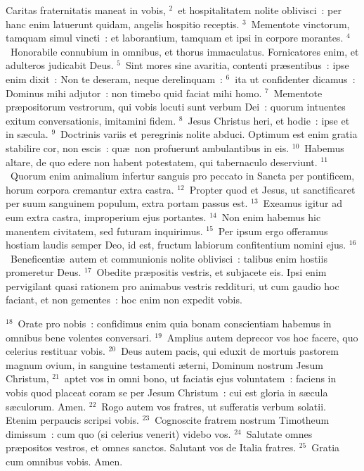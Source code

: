 \lettrine[lines=3,image=true,loversize=0.05,lraise=-0.03]{C}{}aritas fraternitatis maneat in vobis,
${}^{2}$~et hospitalitatem nolite oblivisci~: per hanc enim latuerunt quidam, angelis hospitio receptis.
${}^{3}$~Mementote vinctorum, tamquam simul vincti~: et laborantium, tamquam et ipsi in corpore morantes.
${}^{4}$~Honorabile connubium in omnibus, et thorus immaculatus. Fornicatores enim, et adulteros judicabit Deus.
${}^{5}$~Sint mores sine avaritia, contenti pr\ae sentibus~: ipse enim dixit~: Non te deseram, neque derelinquam~:
${}^{6}$~ita ut confidenter dicamus~: Dominus mihi adjutor~: non timebo quid faciat mihi homo.
${}^{7}$~Mementote pr\ae positorum vestrorum, qui vobis locuti sunt verbum Dei~: quorum intuentes exitum conversationis, imitamini fidem.
${}^{8}$~Jesus Christus heri, et hodie~: ipse et in s\ae cula.
${}^{9}$~Doctrinis variis et peregrinis nolite abduci. Optimum est enim gratia stabilire cor, non escis~: qu\ae\ non profuerunt ambulantibus in eis.
${}^{10}$~Habemus altare, de quo edere non habent potestatem, qui tabernaculo deserviunt.
${}^{11}$~Quorum enim animalium infertur sanguis pro peccato in Sancta per pontificem, horum corpora cremantur extra castra.
${}^{12}$~Propter quod et Jesus, ut sanctificaret per suum sanguinem populum, extra portam passus est.
${}^{13}$~Exeamus igitur ad eum extra castra, improperium ejus portantes.
${}^{14}$~Non enim habemus hic manentem civitatem, sed futuram inquirimus.
${}^{15}$~Per ipsum ergo offeramus hostiam laudis semper Deo, id est, fructum labiorum confitentium nomini ejus.
${}^{16}$~Beneficenti\ae\ autem et communionis nolite oblivisci~: talibus enim hostiis promeretur Deus.
${}^{17}$~Obedite pr\ae positis vestris, et subjacete eis. Ipsi enim pervigilant quasi rationem pro animabus vestris reddituri, ut cum gaudio hoc faciant, et non gementes~: hoc enim non expedit vobis.


${}^{18}$~Orate pro nobis~: confidimus enim quia bonam conscientiam habemus in omnibus bene volentes conversari.
${}^{19}$~Amplius autem deprecor vos hoc facere, quo celerius restituar vobis.
${}^{20}$~Deus autem pacis, qui eduxit de mortuis pastorem magnum ovium, in sanguine testamenti \ae terni, Dominum nostrum Jesum Christum,
${}^{21}$~aptet vos in omni bono, ut faciatis ejus voluntatem~: faciens in vobis quod placeat coram se per Jesum Christum~: cui est gloria in s\ae cula s\ae culorum. Amen.
${}^{22}$~Rogo autem vos fratres, ut sufferatis verbum solatii. Etenim perpaucis scripsi vobis.
${}^{23}$~Cognoscite fratrem nostrum Timotheum dimissum~: cum quo (si celerius venerit) videbo vos.
${}^{24}$~Salutate omnes pr\ae positos vestros, et omnes sanctos. Salutant vos de Italia fratres.
${}^{25}$~Gratia cum omnibus vobis. Amen.
